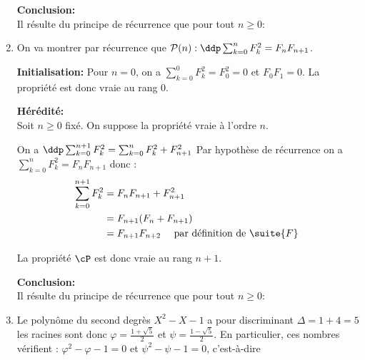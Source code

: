 \begin{correction}
\begin{enumerate}
\textbf{Conclusion:}\\
Il r\'esulte du principe de r\'ecurrence que pour tout $ n\geq 0$:
\begin{center}
\end{center}


\item On  va montrer par récurrence que $\mathcal{P}(n) :\ddp \sum_{k=0}^n F_{k}^2 =F_{n}F_{n+1}$. 



\textbf{Initialisation:}  Pour $n=0$, on a $\sum_{k=0}^0 F_{k}^2 = F_0^2=0$ et $F_0F_1=0$. 
La propriété est donc vraie au rang $0$. 
 
 \textbf{H\'er\'edit\'e:}\\
Soit $n\geq 0$ fix\'e. On suppose la propri\'et\'e vraie \`a l'ordre $n$. 

On a $\ddp \sum_{k=0}^{n+1} F_{k}^2 =\sum_{k=0}^{n} F_{k}^2 +F_{n+1}^2$
Par hypothèse de récurrence on a $\sum_{k=0}^{n} F_{k}^2 = F_n F_{n+1}$ donc : 
\begin{align*}
 \sum_{k=0}^{n+1} F_{k}^2 &=  F_n F_{n+1} +F_{n+1}^2\\
				&= F_{n+1} (F_n +F_{n+1}) \\
				&=   F_{n+1}F_{n+2}  \quad \text{ par définition de $\suite{F}$ }													
\end{align*}

La propriété $\cP$ est donc vraie au rang $n+1$.

\textbf{Conclusion:}\\
Il r\'esulte du principe de r\'ecurrence que pour tout $ n\geq 0$:
\begin{center}
\end{center}

\item Le polynôme du second degrès $X^2-X-1$ a pour discriminant $\Delta =1+4=5$ les racines sont donc 
$\varphi = \frac{1+\sqrt{5}}{2}$ et $\psi=\frac{1-\sqrt{5}}{2}$. 
En particulier, ces nombres vérifient : $\varphi^2 -\varphi -1 =0$ et $\psi^2 -\psi-1=0$, c'est-à-dire 

\begin{center}
\end{center}






\end{enumerate}
\end{correction}
